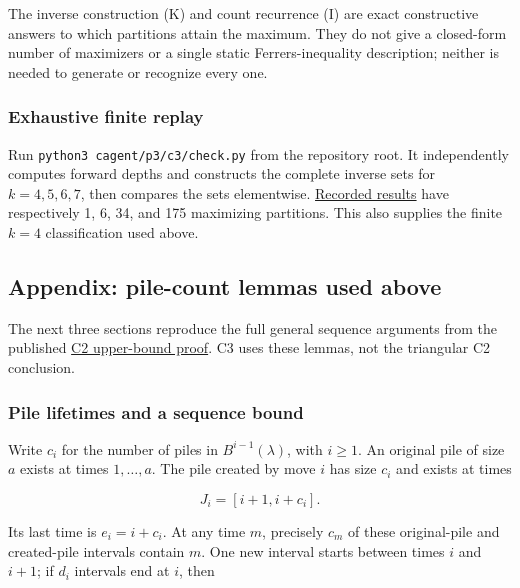 \documentclass[11pt,a4paper]{article}
\begin{document}
The inverse construction (K) and count recurrence (I) are exact constructive answers to which partitions attain the maximum. They do not give a closed-form number of maximizers or a single static Ferrers-inequality description; neither is needed to generate or recognize every one.

\subsubsection{Exhaustive finite replay}\label{exhaustive-finite-replay}

Run \texttt{python3\ cagent/p3/c3/check.py} from the repository root. It independently computes forward depths and constructs the complete inverse sets for \(k=4,5,6,7\), then compares the sets elementwise. \href{https://github.com/mpelteshki/climbing-to-the-frontier/blob/212bba53b1818c08c40b8c4b48f636651eaf6410/cagent/p3/c3/finite-check.json}{Recorded results} have respectively 1, 6, 34, and 175 maximizing partitions. This also supplies the finite \(k=4\) classification used above.

\subsection{Appendix: pile-count lemmas used above}\label{appendix-pile-count-lemmas-used-above}

The next three sections reproduce the full general sequence arguments from the published \href{https://github.com/mpelteshki/climbing-to-the-frontier/blob/212bba53b1818c08c40b8c4b48f636651eaf6410/cagent/p3/c2/upper-bound-proof.md}{C2 upper-bound proof}. C3 uses these lemmas, not the triangular C2 conclusion.

\subsubsection{Pile lifetimes and a sequence bound}\label{pile-lifetimes-and-a-sequence-bound}

Write \(c_i\) for the number of piles in \(B^{i-1}(\lambda)\), with \(i\ge1\). An original pile of size \(a\) exists at times \(1,\ldots,a\). The pile created by move \(i\) has size \(c_i\) and exists at times

\[
J_i=[i+1,i+c_i].
\]

Its last time is \(e_i=i+c_i\). At any time \(m\), precisely \(c_m\) of these original-pile and created-pile intervals contain \(m\). One new interval starts between times \(i\) and \(i+1\); if \(d_i\) intervals end at \(i\), then
\end{document}
